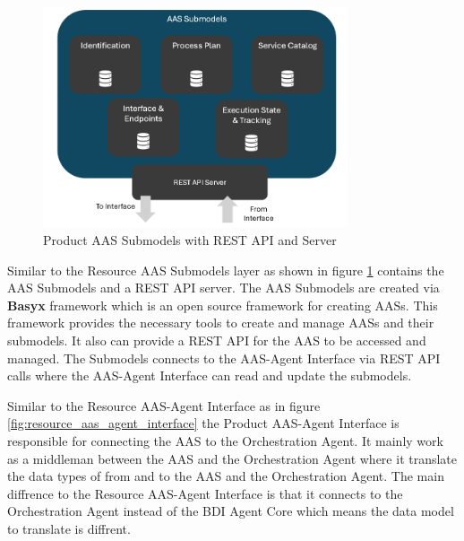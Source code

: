 \newpage
{}
\begin{figure}[h]
    \centering
    \includegraphics[width=0.8\textwidth]{Images/Production_Agent_Submodels_Arch_Overview.png}
    \caption{Product AAS Submodels with REST API and Server}
    \label{fig:product_aas_submodels_rest_api}
\end{figure}

Similar to the Resource AAS Submodels layer as shown in figure \ref{fig:product_aas_submodels_rest_api} contains the AAS Submodels and a REST API server.
The AAS Submodels are created via \textbf{Basyx} framework which is an open source framework for creating AASs.
This framework provides the necessary tools to create and manage AASs and their submodels.
It also can provide a REST API for the AAS to be accessed and managed.
The Submodels connects to the AAS-Agent Interface via REST API calls where the AAS-Agent Interface can read and update the submodels.

\newpage


Similar to the Resource AAS-Agent Interface as in figure \ref{fig:resource_aas_agent_interface} the Product AAS-Agent Interface is responsible for connecting the AAS to the Orchestration Agent.
It mainly work as a middleman between the AAS and the Orchestration Agent where it translate the data types of from and to the AAS and the Orchestration Agent.
The main diffrence to the Resource AAS-Agent Interface is that it connects to the Orchestration Agent instead of the BDI Agent Core which means the data model to translate is diffrent.

